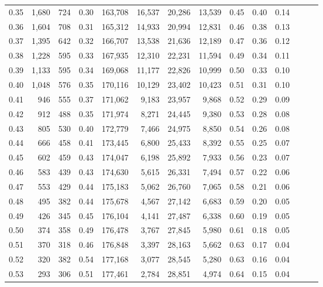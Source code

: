 \begin{tabular}{rrrrrrrrrrrrrr}
0.35 &  1,680 &  724 &  0.30 &  163,708 &   16,537 &  20,286 &  13,539 &  0.45 &  0.40 &      0.14 \\
0.36 &  1,604 &  708 &  0.31 &  165,312 &   14,933 &  20,994 &  12,831 &  0.46 &  0.38 &      0.13 \\
0.37 &  1,395 &  642 &  0.32 &  166,707 &   13,538 &  21,636 &  12,189 &  0.47 &  0.36 &      0.12 \\
0.38 &  1,228 &  595 &  0.33 &  167,935 &   12,310 &  22,231 &  11,594 &  0.49 &  0.34 &      0.11 \\
0.39 &  1,133 &  595 &  0.34 &  169,068 &   11,177 &  22,826 &  10,999 &  0.50 &  0.33 &      0.10 \\
0.40 &  1,048 &  576 &  0.35 &  170,116 &   10,129 &  23,402 &  10,423 &  0.51 &  0.31 &      0.10 \\
0.41 &    946 &  555 &  0.37 &  171,062 &    9,183 &  23,957 &   9,868 &  0.52 &  0.29 &      0.09 \\
0.42 &    912 &  488 &  0.35 &  171,974 &    8,271 &  24,445 &   9,380 &  0.53 &  0.28 &      0.08 \\
0.43 &    805 &  530 &  0.40 &  172,779 &    7,466 &  24,975 &   8,850 &  0.54 &  0.26 &      0.08 \\
0.44 &    666 &  458 &  0.41 &  173,445 &    6,800 &  25,433 &   8,392 &  0.55 &  0.25 &      0.07 \\
0.45 &    602 &  459 &  0.43 &  174,047 &    6,198 &  25,892 &   7,933 &  0.56 &  0.23 &      0.07 \\
0.46 &    583 &  439 &  0.43 &  174,630 &    5,615 &  26,331 &   7,494 &  0.57 &  0.22 &      0.06 \\
0.47 &    553 &  429 &  0.44 &  175,183 &    5,062 &  26,760 &   7,065 &  0.58 &  0.21 &      0.06 \\
0.48 &    495 &  382 &  0.44 &  175,678 &    4,567 &  27,142 &   6,683 &  0.59 &  0.20 &      0.05 \\
0.49 &    426 &  345 &  0.45 &  176,104 &    4,141 &  27,487 &   6,338 &  0.60 &  0.19 &      0.05 \\
0.50 &    374 &  358 &  0.49 &  176,478 &    3,767 &  27,845 &   5,980 &  0.61 &  0.18 &      0.05 \\
0.51 &    370 &  318 &  0.46 &  176,848 &    3,397 &  28,163 &   5,662 &  0.63 &  0.17 &      0.04 \\
0.52 &    320 &  382 &  0.54 &  177,168 &    3,077 &  28,545 &   5,280 &  0.63 &  0.16 &      0.04 \\
0.53 &    293 &  306 &  0.51 &  177,461 &    2,784 &  28,851 &   4,974 &  0.64 &  0.15 &      0.04 \\

\end{tabular}

